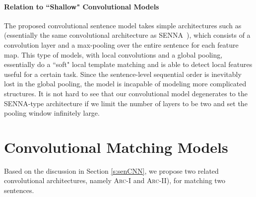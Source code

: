 \documentclass{article} %
\begin{document}
\paragraph{Relation to ``Shallow" Convolutional Models} The proposed convolutional sentence model takes simple architectures such as~\cite{Shenwww2014,emnlp14_kim} (essentially the same convolutional architecture as SENNA~\cite{senna}), which consists of a convolution layer and a max-pooling over the entire sentence for each feature map. This type of models, with local convolutions and a global pooling, essentially do a ``soft" local template matching and is able to detect local features useful for a certain task. Since the sentence-level sequential order is inevitably lost in the global pooling, the model is incapable of modeling more complicated structures. It is not hard to see that our convolutional model degenerates to the SENNA-type architecture if we limit the number of layers to be two and set the pooling window infinitely large.

\section{Convolutional Matching Models}  \vspace{-10pt} \label{s:matchmodel}
Based on the discussion in Section \ref{s:senCNN}, we propose two related convolutional architectures, namely \textsc{Arc-I} and \textsc{Arc-II}), for matching two sentences. \vspace{-5pt}
\end{document}
